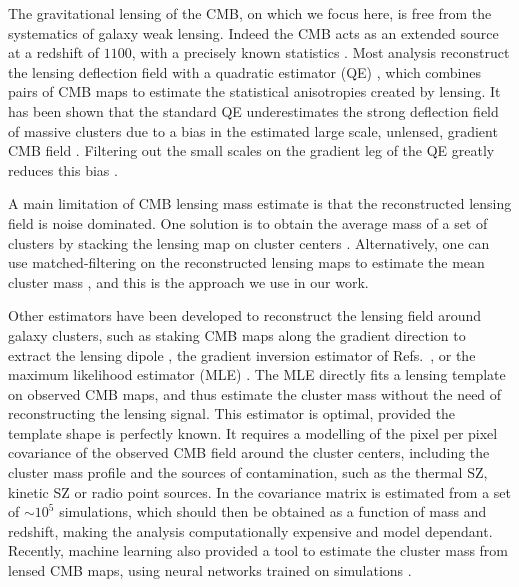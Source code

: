 \documentclass[prd, superscriptaddress, tightenlines, longbibliography, nofootinbib, eqsecnum, amsfonts, amsmath, floatfix, twocolumn, notitlepage]{revtex4-2}
\newcommand{\LL}[1]{{\color{orange}{LL: #1}}}
\begin{document}
The gravitational lensing of the CMB, on which we focus here, is free from the systematics of galaxy weak lensing. Indeed the CMB acts as an extended source at a redshift of $1100$, with a precisely known statistics \cite{Lewis:2006fu}.
Most analysis reconstruct the lensing deflection field with a quadratic estimator (QE) \cite{Hu:2001tn, Hu:2001kj, Okamoto:2003zw, Planck:2018lbu}, which combines pairs of CMB maps to estimate the statistical anisotropies created by lensing. 
It has been shown that the standard QE underestimates the strong deflection field of massive clusters due to a bias in the estimated large scale, unlensed, gradient CMB field \cite{Maturi:2004zj}. Filtering out the small scales on the gradient leg of the QE greatly reduces this bias \cite{Hu:2007bt}.

A main limitation of CMB lensing mass estimate is that the reconstructed lensing field is noise dominated. One solution is to obtain the average mass of a set of clusters by stacking the lensing map on cluster centers \cite{DES:2017fyz, Geach:2017crt, DES:2018myw, ACT:2020izl}. Alternatively, one can use matched-filtering on the reconstructed lensing maps to estimate the mean cluster mass \cite{Melin:2014uaa, Louis:2016gvv, Zubeldia:2019brr}, and this is the approach we use in our work.

Other estimators have been developed to reconstruct the lensing field around galaxy clusters, such as staking CMB maps along the gradient direction to extract the lensing dipole \cite{SPT:2019qkp}, the gradient inversion estimator of Refs.~\cite{Horowitz:2017iql, Hadzhiyska:2019cle}, or the maximum likelihood estimator (MLE) \cite{Lewis:2005fq,Baxter:2014frs, Raghunathan:2017cle}.
The MLE directly fits a lensing template on observed CMB maps, and thus estimate the cluster mass without the need of reconstructing the lensing signal. This estimator is optimal, provided the template shape is perfectly known. It requires a modelling of the pixel per pixel covariance of the observed CMB field around the cluster centers, including the cluster mass profile and the sources of contamination, such as the thermal SZ, kinetic SZ or radio point sources. In \cite{Raghunathan:2017cle} the covariance matrix is estimated from a set of $\sim 10^5$ simulations, which should then be obtained as a function of mass and redshift, making the analysis computationally expensive and model dependant. 
Recently, machine learning also provided a tool to estimate the cluster mass from lensed CMB maps, using neural networks trained on simulations \cite{Gupta:2020him}.
\end{document}
